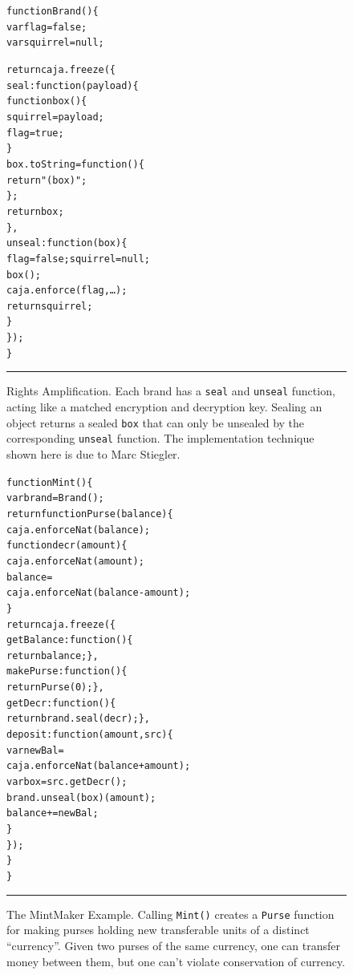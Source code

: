\documentclass[letterpaper,twocolumn,10pt]{article}
\newcommand{\code}[1]{{\tt {#1}}}              %
\begin{document}
\begin{figure}[t!]
\begin{alltt}
function Brand() \{
  var flag = false;
  var squirrel = null;

  return caja.freeze(\{
    seal: function(payload) \{
      function box() \{
        squirrel = payload;
        flag = true;
      \}
      box.toString = function() \{
        return "(box)";
      \};
      return box;
    \},
    unseal: function(box) \{
      flag = false; squirrel = null;
      box();
      caja.enforce(flag,\ldots);
      return squirrel;
    \}
  \});
\}
\end{alltt}

\caption[Rights Amplification]{Rights Amplification. Each brand has a 
\code{seal} and \code{unseal} function, acting like a matched encryption and 
decryption key. Sealing an object returns a sealed \code{box} that can only 
be unsealed by the corresponding \code{unseal} function. The implementation 
technique shown here is due to Marc Stiegler.
\\ } \hrule
\label{fig:rights-amp}
\end{figure}

\begin{figure}[t!]
\begin{alltt}
function Mint() \{
  var brand = Brand();
  return function Purse(balance) \{
    caja.enforceNat(balance);
    function decr(amount) \{
      caja.enforceNat(amount);
      balance = 
        caja.enforceNat(balance - amount);
    \}
    return caja.freeze(\{
      getBalance: function() \{
        return balance; \},
      makePurse: function() \{
        return Purse(0); \},
      getDecr: function() \{
        return brand.seal(decr); \},
      deposit: function(amount,src) \{
        var newBal = 
          caja.enforceNat(balance+amount);
        var box = src.getDecr();
        brand.unseal(box)(amount);
        balance += newBal;
      \}
    \});
  \}
\}
\end{alltt}

\caption[The MintMaker Example]{The MintMaker Example. Calling \code{Mint()} 
creates a \code{Purse} function for making purses holding new transferable 
units of a distinct ``currency''. Given two purses of the same currency, one 
can transfer money between them, but one can't violate conservation of 
currency. \\ } \hrule
\label{fig:mintmaker}
\end{figure}

\end{document}
